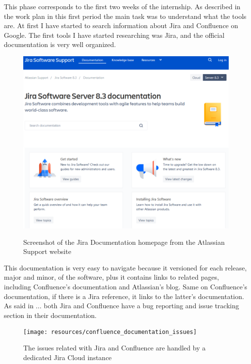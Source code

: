 	This phase corresponds to the first two weeks of the internship.
	As described in the work plan in this first period the main task was to understand what the tools are.
	At first I have started to search information about Jira and Confluence on Google.
	The first tools I have started researching was Jira, and the official documentation is very well organized.
	\begin{figure}[H]
		\centering
		\includegraphics[width=1\textwidth]{resources/jira_documentation}\\
		\caption{Screenshot of the Jira Documentation homepage from the Atlassian Support website}
	\end{figure}
	This documentation is very easy to navigate because it versioned for each release, major and minor, of the software, plus it contains links to related pages, including Confluence's documentation and Atlassian's blog.
	Same on Confluence's documentation, if there is a Jira reference, it links to the latter's documentation.	
	As said in ... both Jira and Confluence have a bug reporting and issue tracking section in their documentation.
	\begin{figure}[H]
		\centering
		\texttt{[image: resources/confluence\_documentation\_issues]}\\
		\caption{The issues related with Jira and Confluence are handled by a dedicated Jira Cloud instance}
	\end{figure}
